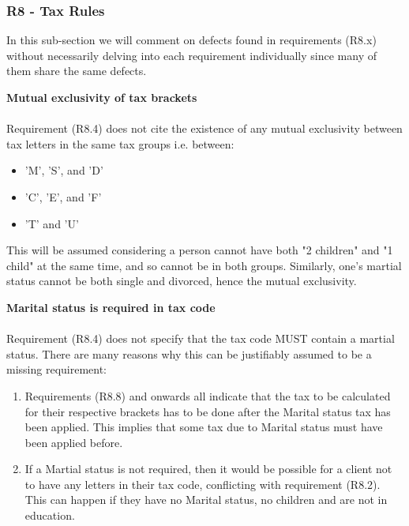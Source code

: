 \subsubsection{R8 - Tax Rules}

In this sub-section we will comment on defects found in requirements (R8.x) without necessarily delving into each requirement individually since many of them share the same defects. 

\textbf{Mutual exclusivity of tax brackets \\}
\\
Requirement (R8.4) does not cite the existence of any mutual exclusivity between tax letters in the same tax groups i.e. between: 
\begin{itemize}[noitemsep]
	\item 'M', 'S', and 'D' 
	\item 'C', 'E', and 'F'
	\item 'T' and 'U'
\end{itemize}

This will be assumed considering a person cannot have both "2 children" and "1 child" at the same time, and so cannot be in both groups. Similarly, one's martial status cannot be both single and divorced, hence the mutual exclusivity.  

\textbf{Marital status is required in tax code \\}
\\
Requirement (R8.4) does not specify that the tax code MUST contain a martial status. There are many reasons why this can be justifiably assumed to be a missing requirement: 
\begin{enumerate}
	\item Requirements (R8.8) and onwards all indicate that the tax to be calculated for their respective brackets has to be done after the Marital status tax has been applied. This implies that some tax due to Marital status must have been applied before. 
	\item If a Martial status is not required, then it would be possible for a client not to have any letters in their tax code, conflicting with requirement (R8.2). This can happen if they have no Marital status, no children and are not in education. 
\end{enumerate}

